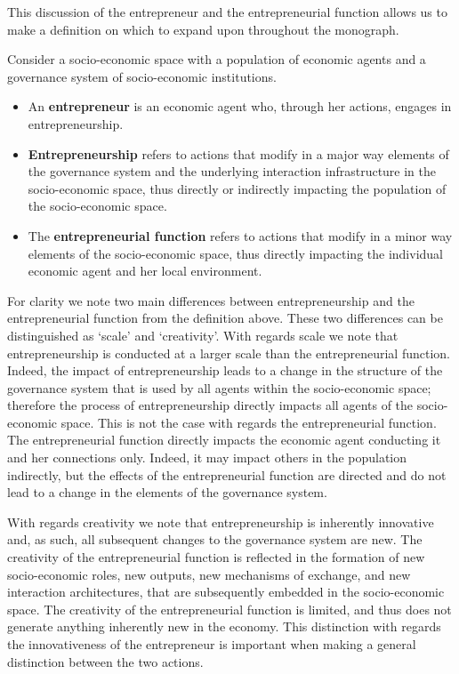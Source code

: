 This discussion of the entrepreneur and the entrepreneurial function allows us to make a definition on which to expand upon throughout the monograph.
\begin{definition} \label{def:entrepreneur}
Consider a socio-economic space with a population of economic agents and a governance system of socio-economic institutions.
\begin{itemize}
\item An \textbf{entrepreneur} is an economic agent who, through her actions, engages in entrepreneurship.
\item \textbf{Entrepreneurship} refers to actions that modify in a major way elements of the governance system and the underlying interaction infrastructure in the socio-economic space, thus directly or indirectly impacting the population of the socio-economic space.
\item The \textbf{entrepreneurial function} refers to actions that modify in a minor way elements of the socio-economic space, thus directly impacting the individual economic agent and her local environment.
\end{itemize}
\end{definition}
For clarity we note two main differences between entrepreneurship and the entrepreneurial function from the definition above. These two differences can be distinguished as `scale' and `creativity'. With regards scale we note that entrepreneurship is conducted at a larger scale than the entrepreneurial function. Indeed, the impact of entrepreneurship leads to a change in the structure of the governance system that is used by all agents within the socio-economic space; therefore the process of entrepreneurship directly impacts all agents of the socio-economic space. This is not the case with regards the entrepreneurial function. The entrepreneurial function directly impacts the economic agent conducting it and her connections only. Indeed, it may impact others in the population indirectly, but the effects of the entrepreneurial function are directed and do not lead to a change in the elements of the governance system.

With regards creativity we note that entrepreneurship is inherently innovative and, as such, all subsequent changes to the governance system are new. The creativity of the entrepreneurial function is reflected in the formation of new socio-economic roles, new outputs, new mechanisms of exchange, and new interaction architectures, that are subsequently embedded in the socio-economic space. The creativity of the entrepreneurial function is limited, and thus does not generate anything inherently new in the economy. This distinction with regards the innovativeness of the entrepreneur is important when making a general distinction between the two actions.

